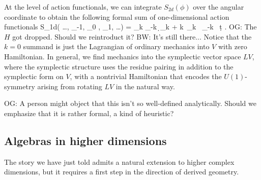\documentclass[11pt]{amsart}
\def\brian#1{{\textcolor{blue!75!red}{BW: {#1}}}}
\def\owen#1{{\textcolor{violet!50!black}{OG: {#1}}}}
\begin{document}
At the level of action functionals, 
we can integrate $S_{2d}(\phi)$ over the angular coordinate to obtain the following formal sum of one-dimensional action functionals
\beqn
S_{1d}\left( \ldots, \phi_{-1}, \phi_0 , \phi_1, \ldots \right) = \sum_{k\in \ZZ} \int  \phi_{-k} \,\d \phi_{k} + k\, \phi_k \, \phi_{-k} \, \d t .
\eeqn 
\owen{The $H$ got dropped. Should we reintroduct it?}
\brian{It's still there...}
Notice that the $k=0$ summand is just the Lagrangian of ordinary mechanics into $V$ with zero Hamiltonian. 
In general, we find mechanics into the symplectic vector space $LV$, where the symplectic structure uses the residue pairing in addition to the symplectic form on $V$, with a nontrivial Hamiltonian that encodes the $U(1)$-symmetry arising from rotating $LV$ in the natural way.

\owen{A person might object that this isn't so well-defined analytically. Should we emphasize that it is rather formal, a kind of heuristic?}

\subsection{Algebras in higher dimensions }
\label{s:alghigh}

The story we have just told admits a natural extension to higher complex dimensions,
but it requires a first step in the direction of derived geometry.
\end{document}
